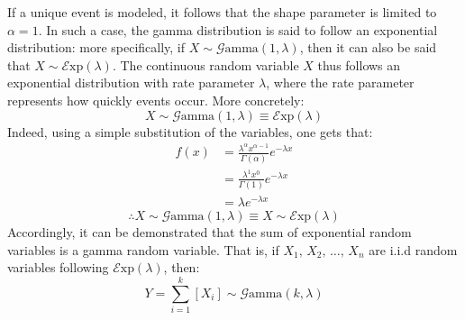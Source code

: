\documentclass[12pt]{article}
\newcommand{\E}{\mathcal{E}}
\newcommand{\G}{\mathcal{G}}
\begin{document}
If a unique event is modeled, it follows that the shape parameter is limited to $\alpha = 1$. In such a case, the gamma
distribution is said to follow an exponential distribution: more specifically, if $X\sim\G\text{amma}(1, \lambda)$, then
it can also be said that $X\sim\E\text{xp}(\lambda)$. The continuous random variable $X$ thus follows an exponential
distribution with rate parameter $\lambda$, where the rate parameter represents how quickly events occur. More
concretely:
\begin{equation}
	X\sim\G\text{amma}(1, \lambda)\equiv\E\text{xp}(\lambda)
\end{equation}
Indeed, using a simple substitution of the variables, one gets that:
\begin{equation}\label{eq:relation:exp}
	\begin{split}
		f(x)	&=	\frac{\lambda^\alpha x^{\alpha-1}}{\Gamma(\alpha)}e^{-\lambda x}\\
				&=	\frac{\lambda^1 x^{0}}{\Gamma(1)}e^{-\lambda x}\\
				&=	\lambda e^{-\lambda x}
	\end{split}
\end{equation}
\begin{equation}
	\therefore X\sim\G\text{amma}(1, \lambda)\equiv X\sim\E\text{xp}(\lambda)
\end{equation}
Accordingly, it can be demonstrated that the sum of exponential random variables is a gamma random variable. That is, if
$X_1,\,X_2,\,\ldots,\,X_n$ are i.i.d random variables following $\E\text{xp}(\lambda)$, then:
\begin{equation}
	Y=\sum^k_{i=1}\left[X_i\right]\sim\G\text{amma}(k, \lambda)
\end{equation}
\end{document}
